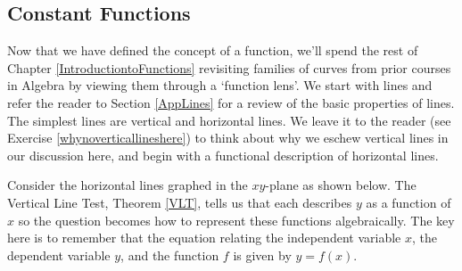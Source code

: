 

\setcounter{footnote}{0}

\label{ConstantandLinearFunctions}

\subsection{Constant Functions}
\label{ConstantFunctions}

Now that we have defined the concept of a function, we'll spend the rest of Chapter \ref{IntroductiontoFunctions} revisiting families of curves from prior courses in Algebra by  viewing them through a `function lens'.  We start with lines and refer the reader to Section \ref{AppLines} for a review of the basic properties of lines.  The simplest lines are vertical and horizontal lines.  We leave it to the reader (see Exercise \ref{whynoverticallineshere}) to think about why we eschew vertical lines in our discussion here, and begin with a functional description of horizontal lines.  

\medskip

Consider the horizontal lines graphed in the $xy$-plane as shown below. The Vertical Line Test, Theorem \ref{VLT}, tells us that each describes $y$ as a function of $x$ so the question becomes how to represent these functions algebraically. The key here is to remember that the equation relating the independent variable $x$,  the dependent variable  $y$, and the function $f$ is given by $y = f(x)$.

